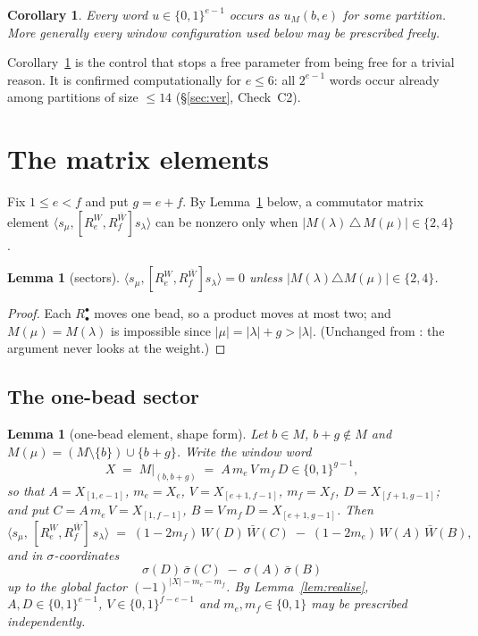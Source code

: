 \documentclass[11pt]{article}
\newtheorem{lemma}[theorem]{Lemma}
\newtheorem{corollary}[theorem]{Corollary}
\theoremstyle{definition}
\theoremstyle{remark}
\begin{document}
\begin{corollary}\label{cor:realise}
Every word $u\in\{0,1\}^{e-1}$ occurs as $u_M(b,e)$ for some partition.  More generally
every window configuration used below may be prescribed freely.
\end{corollary}

Corollary~\ref{cor:realise} is the control that stops a free parameter from being free
for a trivial reason.  It is confirmed computationally for $e\le6$: all $2^{e-1}$ words
occur already among partitions of size $\le14$ (\S\ref{sec:ver}, Check~C2).

\section{The matrix elements}

Fix $1\le e<f$ and put $g=e+f$.  By Lemma~\ref{lem:sectors} below, a commutator matrix
element $\langle s_\mu,[R_e^{W},R_f^{\bar W}]s_\lambda\rangle$ can be nonzero only when
$|M(\lambda)\,\triangle\,M(\mu)|\in\{2,4\}$.

\begin{lemma}[sectors]\label{lem:sectors}
$\langle s_\mu,[R_e^{W},R_f^{\bar W}]s_\lambda\rangle=0$ unless
$|M(\lambda)\triangle M(\mu)|\in\{2,4\}$.
\end{lemma}

\begin{proof}
Each $R^{\bullet}_\bullet$ moves one bead, so a product moves at most two; and
$M(\mu)=M(\lambda)$ is impossible since $|\mu|=|\lambda|+g>|\lambda|$.  (Unchanged from
\cite{Q147}: the argument never looks at the weight.)
\end{proof}

\subsection{The one-bead sector}

\begin{lemma}[one-bead element, shape form]\label{lem:onebead}
Let $b\in M$, $b+g\notin M$ and $M(\mu)=(M\setminus\{b\})\cup\{b+g\}$.  Write the window
word
\[
   X \;=\; M\big|_{(b,b+g)}\;=\;A\,m_e\,V\,m_f\,D \in\{0,1\}^{g-1},
\]
so that $A=X_{[1,e-1]}$, $m_e=X_e$, $V=X_{[e+1,f-1]}$, $m_f=X_f$, $D=X_{[f+1,g-1]}$; and
put $C=A\,m_e\,V=X_{[1,f-1]}$, $B=V\,m_f\,D=X_{[e+1,g-1]}$.  Then
\[
  \bigl\langle s_\mu,\,[R_e^{W},R_f^{\bar W}]\,s_\lambda\bigr\rangle
  \;=\;(1-2m_f)\,W(D)\,\bar W(C)\;-\;(1-2m_e)\,W(A)\,\bar W(B),
\]
and in $\sigma$-coordinates
\begin{equation}\label{eq:1B}
  \boxed{\ \sigma(D)\,\bar\sigma(C)\;-\;\sigma(A)\,\bar\sigma(B)\ }
\end{equation}
\emph{up to the global factor $(-1)^{|X|-m_e-m_f}$.}  By Lemma~\ref{lem:realise},
$A,D\in\{0,1\}^{e-1}$, $V\in\{0,1\}^{f-e-1}$ and $m_e,m_f\in\{0,1\}$ may be prescribed
independently.
\end{lemma}
\end{document}
